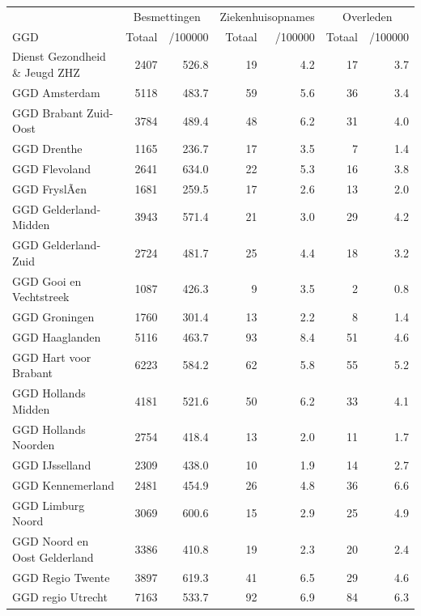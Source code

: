 \documentclass[
  english,
  man,floatsintext]{apa6}
\begin{document}
\begin{table}[H]
\centering\begingroup\fontsize{10}{12}\selectfont

\begin{threeparttable}
\begin{tabular}{lrrrrrr}
\toprule
\multicolumn{1}{c}{ } & \multicolumn{2}{c}{Besmettingen} & \multicolumn{2}{c}{Ziekenhuisopnames} & \multicolumn{2}{c}{Overleden} \\
\cmidrule(l{3pt}r{3pt}){2-3} \cmidrule(l{3pt}r{3pt}){4-5} \cmidrule(l{3pt}r{3pt}){6-7}
GGD & Totaal & /100000 & Totaal & /100000 & Totaal & /100000\\
\midrule
Dienst Gezondheid \& Jeugd ZHZ & 2407 & 526.8 & 19 & 4.2 & 17 & 3.7\\
GGD Amsterdam & 5118 & 483.7 & 59 & 5.6 & 36 & 3.4\\
GGD Brabant Zuid-Oost & 3784 & 489.4 & 48 & 6.2 & 31 & 4.0\\
GGD Drenthe & 1165 & 236.7 & 17 & 3.5 & 7 & 1.4\\
GGD Flevoland & 2641 & 634.0 & 22 & 5.3 & 16 & 3.8\\
GGD FryslÃ¢n & 1681 & 259.5 & 17 & 2.6 & 13 & 2.0\\
GGD Gelderland-Midden & 3943 & 571.4 & 21 & 3.0 & 29 & 4.2\\
GGD Gelderland-Zuid & 2724 & 481.7 & 25 & 4.4 & 18 & 3.2\\
GGD Gooi en Vechtstreek & 1087 & 426.3 & 9 & 3.5 & 2 & 0.8\\
GGD Groningen & 1760 & 301.4 & 13 & 2.2 & 8 & 1.4\\
GGD Haaglanden & 5116 & 463.7 & 93 & 8.4 & 51 & 4.6\\
GGD Hart voor Brabant & 6223 & 584.2 & 62 & 5.8 & 55 & 5.2\\
GGD Hollands Midden & 4181 & 521.6 & 50 & 6.2 & 33 & 4.1\\
GGD Hollands Noorden & 2754 & 418.4 & 13 & 2.0 & 11 & 1.7\\
GGD IJsselland & 2309 & 438.0 & 10 & 1.9 & 14 & 2.7\\
GGD Kennemerland & 2481 & 454.9 & 26 & 4.8 & 36 & 6.6\\
GGD Limburg Noord & 3069 & 600.6 & 15 & 2.9 & 25 & 4.9\\
GGD Noord en Oost Gelderland & 3386 & 410.8 & 19 & 2.3 & 20 & 2.4\\
GGD Regio Twente & 3897 & 619.3 & 41 & 6.5 & 29 & 4.6\\
GGD regio Utrecht & 7163 & 533.7 & 92 & 6.9 & 84 & 6.3\\

\end{tabular}
\end{threeparttable}
\end{table}
\end{document}
